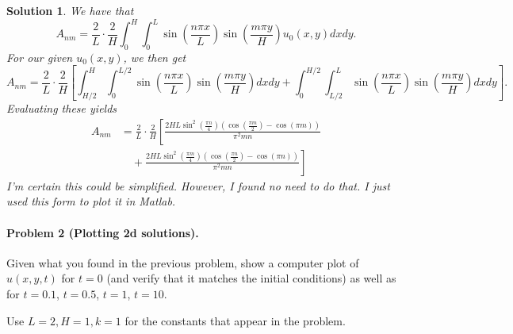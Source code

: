 \documentclass[leqno]{article}
\theoremstyle{nonumberplain}
\newtheorem{solution}{Solution}
\begin{document}
\begin{solution}
We have that
\[
A_{nm}=\frac{2}{L}\cdot \frac{2}{H} \int_{0}^H \int_0^L \sin \left(\frac{ n \pi x}{L}\right) \sin \left( \frac{m \pi y}{H}\right) u_0(x,y) dxdy.
\]
For our given $u_0(x,y)$, we then get
\[
A_{nm}=\frac{2}{L}\cdot \frac{2}{H} \left[ \int_{H/2}^H \int_0^{L/2} \sin \left(\frac{ n \pi x}{L}\right) \sin \left( \frac{m \pi y}{H}\right) dxdy + \int_{0}^{H/2} \int_{L/2}^L \sin \left(\frac{ n \pi x}{L}\right) \sin \left( \frac{m \pi y}{H}\right) dxdy\right].
\]
Evaluating these yields
\begin{align*}
    A_{nm}&=\frac{2}{L}\cdot \frac{2}{H} \left[ \frac{2HL \sin^2 \left(\frac{\pi n}{4}\right)\left( \cos \left(\frac{\pi m}{2}\right) - \cos (\pi m)\right)}{\pi^2 m n}\right. \\
    &\quad+\left. \frac{2HL \sin^2\left( \frac{\pi m}{4}\right)\left(\cos \left(\frac{\pi n}{2}\right)-\cos(\pi n)\right)}{\pi^2 m n}\right]
\end{align*}
\emph{I'm certain this could be simplified. However, I found no need to do that. I just used this form to plot it in Matlab.}
\end{solution}
\pagebreak


\paragraph{Problem 2 (Plotting 2d solutions).}
Given what you found in the previous problem, show a computer plot of
$u(x,y,t)$ for $t=0$ (and verify that it matches the initial
conditions) as well as for $t=0.1$, $t=0.5$, $t=1$, $t=10$.

Use $L=2,H=1,k=1$ for the constants that appear in the problem.
\end{document}
